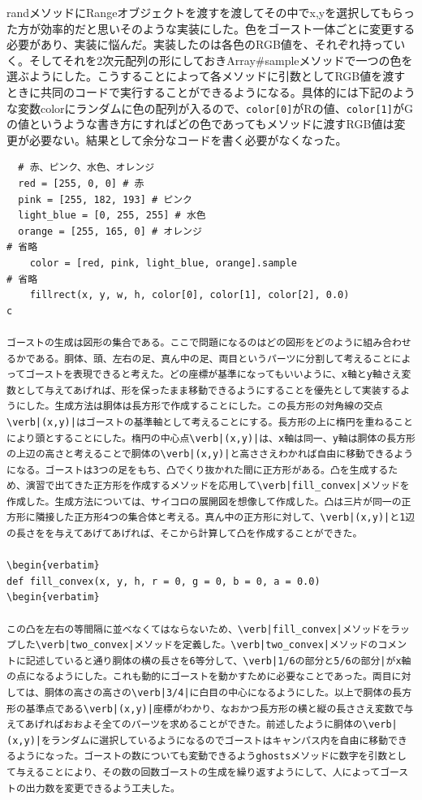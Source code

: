 \documentclass[12pt,a4j]{jarticle}
\begin{document}
randメソッドにRangeオブジェクトを渡すを渡してその中でx,yを選択してもらった方が効率的だと思いそのような実装にした。色をゴースト一体ごとに変更する必要があり、実装に悩んだ。実装したのは各色のRGB値を、それぞれ持っていく。そしてそれを2次元配列の形にしておきArray#sampleメソッドで一つの色を選ぶようにした。こうすることによって各メソッドに引数としてRGB値を渡すときに共同のコードで実行することができるようになる。具体的には下記のような変数colorにランダムに色の配列が入るので、\verb|color[0]|がRの値、\verb|color[1]|がGの値というような書き方にすればどの色であってもメソッドに渡すRGB値は変更が必要ない。結果として余分なコードを書く必要がなくなった。

\begin{verbatim}
  # 赤、ピンク、水色、オレンジ
  red = [255, 0, 0] # 赤
  pink = [255, 182, 193] # ピンク
  light_blue = [0, 255, 255] # 水色
  orange = [255, 165, 0] # オレンジ
# 省略
    color = [red, pink, light_blue, orange].sample
# 省略
    fillrect(x, y, w, h, color[0], color[1], color[2], 0.0)
c

ゴーストの生成は図形の集合である。ここで問題になるのはどの図形をどのように組み合わせるかである。胴体、頭、左右の足、真ん中の足、両目というパーツに分割して考えることによってゴーストを表現できると考えた。どの座標が基準になってもいいように、x軸とy軸さえ変数として与えてあげれば、形を保ったまま移動できるようにすることを優先として実装するようにした。生成方法は胴体は長方形で作成することにした。この長方形の対角線の交点\verb|(x,y)|はゴーストの基準軸として考えることにする。長方形の上に楕円を重ねることにより頭とすることにした。楕円の中心点\verb|(x,y)|は、x軸は同一、y軸は胴体の長方形の上辺の高さと考えることで胴体の\verb|(x,y)|と高ささえわかれば自由に移動できるようになる。ゴーストは3つの足をもち、凸でくり抜かれた間に正方形がある。凸を生成するため、演習で出てきた正方形を作成するメソッドを応用して\verb|fill_convex|メソッドを作成した。生成方法については、サイコロの展開図を想像して作成した。凸は三片が同一の正方形に隣接した正方形4つの集合体と考える。真ん中の正方形に対して、\verb|(x,y)|と1辺の長さをを与えてあげてあげれば、そこから計算して凸を作成することができた。

\begin{verbatim}
def fill_convex(x, y, h, r = 0, g = 0, b = 0, a = 0.0)
\begin{verbatim}

この凸を左右の等間隔に並べなくてはならないため、\verb|fill_convex|メソッドをラップした\verb|two_convex|メソッドを定義した。\verb|two_convex|メソッドのコメントに記述していると通り胴体の横の長さを6等分して、\verb|1/6の部分と5/6の部分|がx軸の点になるようにした。これも動的にゴーストを動かすために必要なことであった。両目に対しては、胴体の高さの高さの\verb|3/4|に白目の中心になるようにした。以上で胴体の長方形の基準点である\verb|(x,y)|座標がわかり、なおかつ長方形の横と縦の長ささえ変数で与えてあげればおおよそ全てのパーツを求めることができた。前述したように胴体の\verb|(x,y)|をランダムに選択しているようになるのでゴーストはキャンパス内を自由に移動できるようになった。ゴーストの数についても変動できるようghostsメソッドに数字を引数として与えることにより、その数の回数ゴーストの生成を繰り返すようにして、人によってゴーストの出力数を変更できるよう工夫した。


\end{verbatim}
\end{document}
